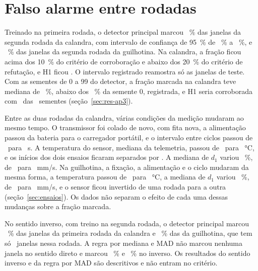 \section{Falso alarme entre rodadas}\label{sec:res-h1}

Treinado na primeira rodada, o detector principal marcou \hUmCalandraIFDireto~\% das janelas da segunda rodada da calandra, com intervalo de confiança de \SI{95}{\percent} de \hUmCalandraIFDiretoInf~\% a \hUmCalandraIFDiretoSup~\%, e \hUmGuilhotinaIFDireto~\% das janelas da segunda rodada da guilhotina. Na calandra, a fração ficou acima dos \SI{10}{\percent} do critério de corroboração e abaixo dos \SI{20}{\percent} do critério de refutação, e H1 ficou \hUmVeredito. O intervalo registrado reamostra só as janelas de teste. Com as sementes de 0 a \num{99} do detector, a fração marcada na calandra teve mediana de \apTresSementeCalandraMed~\%, abaixo dos \hUmFracaoCalandra~\% da semente 0, registrada, e H1 seria corroborada com \apTresVereditoUmCorroborada\ das \apTresSementes\ sementes (seção~\ref{sec:res-ap3}).

Entre as duas rodadas da calandra, várias condições da medição mudaram ao mesmo tempo. O transmissor foi colado de novo, com fita nova, a alimentação passou da bateria para o carregador portátil, e o intervalo entre ciclos passou de \campoCicloUm\ para \campoCicloDois~s. A temperatura do sensor, mediana da telemetria, passou de \campoTempCalandraUm\ para \campoTempCalandraDois~\si{\celsius}, e os inícios dos dois ensaios ficaram separados por \campoIntervaloCalandra. A mediana de $d_1$ variou \repetCalandraDif~\%, de \repetCalandraUm\ para \repetCalandraDois~mm/s. Na guilhotina, a fixação, a alimentação e o ciclo mudaram da mesma forma, a temperatura passou de \campoTempGuilhotinaUm\ para \campoTempGuilhotinaDois~\si{\celsius}, a mediana de $d_1$ variou \repetGuilhotinaDif~\%, de \repetGuilhotinaUm\ para \repetGuilhotinaDois~mm/s, e o sensor ficou invertido de uma rodada para a outra (seção~\ref{sec:ensaios}). Os dados não separam o efeito de cada uma dessas mudanças sobre a fração marcada.

No sentido inverso, com treino na segunda rodada, o detector principal marcou \hUmCalandraIFInverso~\% das janelas da primeira rodada da calandra e \hUmGuilhotinaIFInverso~\% das da guilhotina, que tem só \campoJanelasGuilhotinaUm\ janelas nessa rodada. A regra por mediana e MAD não marcou nenhuma janela no sentido direto e marcou \hUmCalandraMADInverso~\% e \hUmGuilhotinaMADInverso~\% no inverso. Os resultados do sentido inverso e da regra por MAD são descritivos e não entram no critério.

